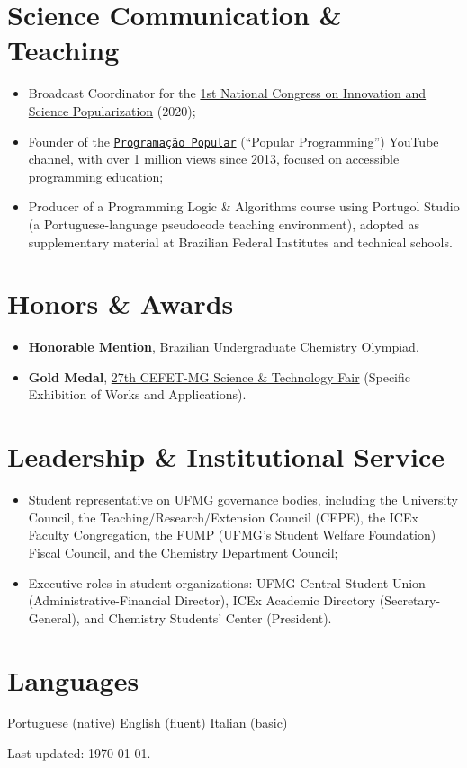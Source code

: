 \documentclass[10pt,a4paper]{article}
\newcommand*{\link}[2]{\href{#1}{{\texttt{#2}}}}
\begin{document}
\section*{Science Communication \& Teaching}
\begin{itemize}
  \item Broadcast Coordinator for the \href{https://repositorio.ufmg.br/bitstream/1843/50717/1/I%20Congresso%20Nacional%20de%20Inova%C3%A7%C3%A3o%20e%20Populariza%C3%A7%C3%A3o%20da%20Ci%C3%AAncia%20a%C3%A7%C3%B5es%20durante%20a%20covid-19.pdf}{1st National Congress on Innovation and Science Popularization} (2020);
  \item Founder of the \link{https://www.youtube.com/channel/UCsXyoSkpyZB741fkBKeEovQ}{Programação Popular} (``Popular Programming'') YouTube channel, with over 1 million views since 2013, focused on accessible programming education;
  \item Producer of a Programming Logic \& Algorithms course using Portugol Studio (a Portuguese-language pseudocode teaching environment), adopted as supplementary material at Brazilian Federal Institutes and technical schools.
\end{itemize}

\section*{Honors \& Awards}
\begin{itemize}
  \item \textbf{Honorable Mention}, \href{https://obesq.obquimica.org}{Brazilian Undergraduate Chemistry Olympiad}.
  \item \textbf{Gold Medal}, \href{https://www.meta2017.cefetmg.br}{27th CEFET-MG Science \& Technology Fair} (Specific Exhibition of Works and Applications).
\end{itemize}

\section*{Leadership \& Institutional Service}
\begin{itemize}
  \item Student representative on UFMG governance bodies, including the University Council, the Teaching/Research/Extension Council (CEPE), the ICEx Faculty Congregation, the FUMP (UFMG's Student Welfare Foundation) Fiscal Council, and the Chemistry Department Council;
  \item Executive roles in student organizations: UFMG Central Student Union (Administrative-Financial Director), ICEx Academic Directory (Secretary-General), and Chemistry Students' Center (President).
\end{itemize}

\section*{Languages}
Portuguese (native) \textbar{} English (fluent) \textbar{} Italian (basic)

\begin{flushright}\scriptsize%
Last updated: \today.%
\end{flushright}
\end{document}
